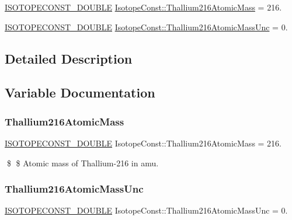 \begin{DoxyCompactItemize}
\item 
\mbox{\hyperlink{group___isotope_const-_macros_ga8f45a7272ce02c0b4c65c44636ed719a}{I\+S\+O\+T\+O\+P\+E\+C\+O\+N\+S\+T\+\_\+\+D\+O\+U\+B\+LE}} \mbox{\hyperlink{group___isotope_const-_thallium-_tl216_ga5be11c04ca0aa71890e38c2b9e0a2157}{Isotope\+Const\+::\+Thallium216\+Atomic\+Mass}} = 216.
\item 
\mbox{\hyperlink{group___isotope_const-_macros_ga8f45a7272ce02c0b4c65c44636ed719a}{I\+S\+O\+T\+O\+P\+E\+C\+O\+N\+S\+T\+\_\+\+D\+O\+U\+B\+LE}} \mbox{\hyperlink{group___isotope_const-_thallium-_tl216_gaf1a5f714cc96e03b74fee76326e8c2db}{Isotope\+Const\+::\+Thallium216\+Atomic\+Mass\+Unc}} = 0.
\end{DoxyCompactItemize}


\subsection{Detailed Description}


\subsection{Variable Documentation}
\mbox{\label{group___isotope_const-_thallium-_tl216_ga5be11c04ca0aa71890e38c2b9e0a2157}} 
\subsubsection{\texorpdfstring{Thallium216\+Atomic\+Mass}{Thallium216AtomicMass}}
{\footnotesize\ttfamily \mbox{\hyperlink{group___isotope_const-_macros_ga8f45a7272ce02c0b4c65c44636ed719a}{I\+S\+O\+T\+O\+P\+E\+C\+O\+N\+S\+T\+\_\+\+D\+O\+U\+B\+LE}} Isotope\+Const\+::\+Thallium216\+Atomic\+Mass = 216.}

\$ \$ Atomic mass of Thallium-\/216 in amu. \mbox{\label{group___isotope_const-_thallium-_tl216_gaf1a5f714cc96e03b74fee76326e8c2db}} 
\subsubsection{\texorpdfstring{Thallium216\+Atomic\+Mass\+Unc}{Thallium216AtomicMassUnc}}
{\footnotesize\ttfamily \mbox{\hyperlink{group___isotope_const-_macros_ga8f45a7272ce02c0b4c65c44636ed719a}{I\+S\+O\+T\+O\+P\+E\+C\+O\+N\+S\+T\+\_\+\+D\+O\+U\+B\+LE}} Isotope\+Const\+::\+Thallium216\+Atomic\+Mass\+Unc = 0.}

